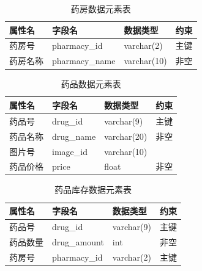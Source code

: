 \documentclass{article}
\begin{document}
\begin{table}[H]
    \centering
    \begin{tabularx}{\textwidth}{|>{\raggedright\arraybackslash}X|>{\raggedright\arraybackslash}X|>{\raggedright\arraybackslash}X|>{\raggedright\arraybackslash}X|}
    \toprule
    \textbf{属性名} & \textbf{字段名} & \textbf{数据类型} & \textbf{约束} \\ \midrule
    药房号 & pharmacy\_id & varchar(2) & 主键 \\ \midrule
    药房名称 & pharmacy\_name & varchar(10) & 非空 \\ \bottomrule
    \end{tabularx}
    \caption{药房数据元素表}
    \label{tab:pharmacy_elements}
\end{table}

\begin{table}[H]
    \centering
    \begin{tabularx}{\textwidth}{|>{\raggedright\arraybackslash}X|>{\raggedright\arraybackslash}X|>{\raggedright\arraybackslash}X|>{\raggedright\arraybackslash}X|}
    \toprule
    \textbf{属性名} & \textbf{字段名} & \textbf{数据类型} & \textbf{约束} \\ \midrule
    药品号 & drug\_id & varchar(9) & 主键 \\ \midrule
    药品名称 & drug\_name & varchar(20) & 非空 \\ \midrule
    图片号 & image\_id & varchar(10) &  \\ \midrule
    药品价格 & price & float & 非空 \\ \bottomrule
    \end{tabularx}
    \caption{药品数据元素表}
    \label{tab:drug_elements}
\end{table}

\begin{table}[H]
    \centering
    \begin{tabularx}{\textwidth}{|>{\raggedright\arraybackslash}X|>{\raggedright\arraybackslash}X|>{\raggedright\arraybackslash}X|>{\raggedright\arraybackslash}X|}
    \toprule
    \textbf{属性名} & \textbf{字段名} & \textbf{数据类型} & \textbf{约束} \\ \midrule
    药品号 & drug\_id & varchar(9) & 主键 \\ \midrule
    药品数量 & drug\_amount & int & 非空 \\ \midrule
    药房号 & pharmacy\_id & varchar(2) & 主键 \\ \bottomrule
    \end{tabularx}
    \caption{药品库存数据元素表}
    \label{tab:drug_storage_elements}
\end{table}
\end{document}
